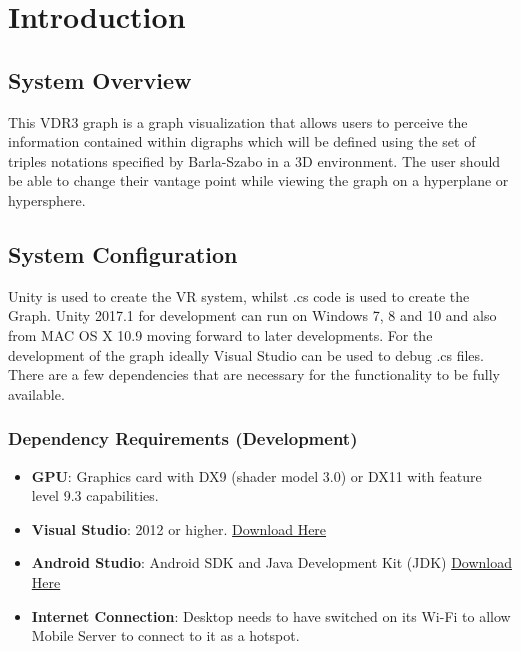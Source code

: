 \documentclass[english]{article}
\begin{document}

\tableofcontents
\newpage

\setcounter{page}{1}

\section{Introduction}
\subsection{System Overview}
This VDR3 graph is a graph visualization that allows users to perceive the information contained within digraphs which will be defined using the set of triples notations specified by Barla-Szabo in a 3D environment. The user should be able to change their vantage point while viewing the graph on a hyperplane or hypersphere.

\subsection{System Configuration}
Unity is used to create the VR system, whilst .cs code is used to create the Graph. Unity 2017.1 for development can run on Windows 7, 8 and 10 and also from MAC OS X 10.9 moving forward to later developments. For the development of the graph ideally Visual Studio can be used to debug .cs files. There are a few dependencies that are necessary for the functionality to be fully available.

\subsubsection{Dependency Requirements (Development)} 

\begin{itemize}
	\item \textbf{GPU}: Graphics card with DX9 (shader model 3.0) or DX11 with feature level 9.3 capabilities.
	\item \textbf{Visual Studio}: 2012 or higher. \href{https://www.visualstudio.com/downloads/}{Download Here}
	\item \textbf{Android Studio}: Android SDK and Java Development Kit (JDK) \href{https://developer.android.com/studio/index.html}{Download Here}
	
	\item \textbf{Internet Connection}: Desktop needs to have switched on its Wi-Fi to allow Mobile Server to connect to it as a hotspot.
	
\end{itemize}
\end{document}
